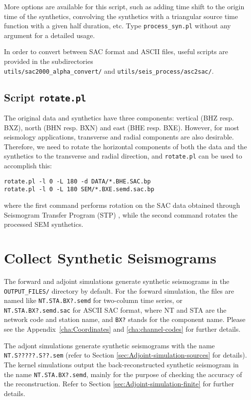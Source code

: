 More options are available for this script, such as adding time shift
to the origin time of the synthetics, convolving the synthetics with
a triangular source time function with a given half duration, etc.
Type \texttt{process\_syn.pl} without any argument for a detailed
usage.

In order to convert between SAC format and ASCII files, useful scripts
are provided in the subdirectories ~\\
 \texttt{utils/sac2000\_alpha\_convert/} and \texttt{utils/seis\_process/asc2sac/}.


\subsection{Script \texttt{rotate.pl}}

The original data and synthetics have three components: vertical (BHZ
resp. BXZ), north (BHN resp. BXN) and east (BHE resp. BXE). However,
for most seismology applications, transverse and radial components
are also desirable. Therefore, we need to rotate the horizontal components
of both the data and the synthetics to the transverse and radial direction,
and \texttt{\small rotate.pl}{\small{} can be used to accomplish this:}{\small \par}
\begin{verbatim}
rotate.pl -l 0 -L 180 -d DATA/*.BHE.SAC.bp
rotate.pl -l 0 -L 180 SEM/*.BXE.semd.sac.bp
\end{verbatim}
where the first command performs rotation on the SAC data obtained
through Seismogram Transfer Program (STP) ,
while the second command rotates the processed SEM synthetics.


\section{Collect Synthetic Seismograms}

The forward and adjoint simulations generate synthetic seismograms
in the \texttt{OUTPUT\_FILES/} directory by default. For the forward
simulation, the files are named like \texttt{NT.STA.BX?.semd} for
two-column time series, or \texttt{NT.STA.BX?.semd.sac} for ASCII
SAC format, where NT and STA are the network code and station name,
and \texttt{BX?} stands for the component name. Please see the Appendix~\ref{cha:Coordinates}
and \ref{cha:channel-codes} for further details.

The adjont simulations generate synthetic seismograms with the name
\texttt{NT.S?????.S??.sem} (refer to Section \ref{sec:Adjoint-simulation-sources}
for details). The kernel simulations output the back-reconstructed
synthetic seismogram in the name \texttt{NT.STA.BX?.semd}, mainly
for the purpose of checking the accuracy of the reconstruction. Refer
to Section \ref{sec:Adjoint-simulation-finite} for further details.


